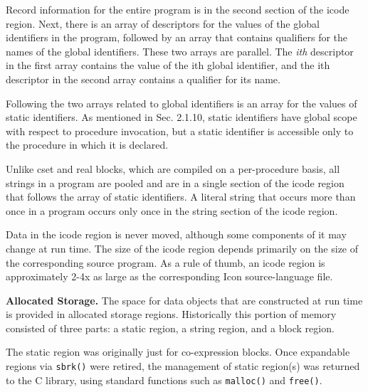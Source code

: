 Record information for the entire program is in the second section of
the icode region. Next, there is an array of descriptors for the
values of the global identifiers in the program, followed by an array
that contains qualifiers for the names of the global
identifiers. These two arrays are parallel. The \textit{ith}
descriptor in the first array contains the value of the ith global
identifier, and the ith descriptor in the second array contains a
qualifier for its name.

Following the two arrays related to global identifiers is an array for
the values of static identifiers. As mentioned in Sec. 2.1.10, static
identifiers have global scope with respect to procedure invocation,
but a static identifier is accessible only to the procedure in which
it is declared.

Unlike cset and real blocks, which are compiled on a per-procedure
basis, all strings in a program are pooled and are in a single section
of the icode region that follows the array of static identifiers. A
literal string that occurs more than once in a program occurs only
once in the string section of the icode region.

Data in the icode region is never moved, although some components of
it may change at run time. The size of the icode region depends
primarily on the size of the corresponding source program. As a rule
of thumb, an icode region is approximately 2-4x as large as the
corresponding Icon source-language file.


\textbf{Allocated Storage.} The space for data objects that are
constructed at run time is provided in allocated storage regions.
Historically this portion of memory consisted of three parts: a
static region, a string region, and a block region.


The static region was originally just for co-expression blocks.
Once expandable regions via \texttt{sbrk()} were retired, the
management of static region(s) was returned to the C library,
using standard functions such as \texttt{malloc()} and \texttt{free()}.

